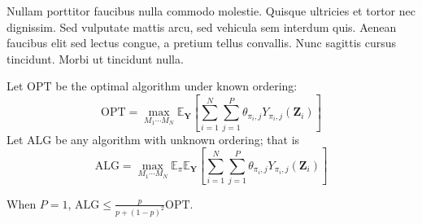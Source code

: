  Nullam porttitor faucibus nulla commodo molestie. Quisque ultricies et tortor nec dignissim. Sed vulputate mattis arcu, sed vehicula sem interdum quis. Aenean faucibus elit sed lectus congue, a pretium tellus convallis. Nunc sagittis cursus tincidunt. Morbi ut tincidunt nulla.
\begin{theorem}
    Let $\mathrm{OPT}$ be the optimal algorithm under known ordering: 
    \begin{equation}
        \mathrm{OPT} = \max_{M_{1} \cdots M_{N}} \mathbb{E}_{\mathbf{Y}}[\sum_{i=1}^{N} \sum_{j=1}^{P} \theta_{\pi_{i},j} Y_{\pi_{i},j}(\mathbf{Z}_{i})]
    \end{equation}
    Let $\mathrm{ALG}$ be any algorithm with unknown ordering; that is
    \begin{equation}
        \mathrm{ALG} = \max_{M_{1} \cdots M_{N}} \mathbb{E}_{\pi} \mathbb{E}_{\mathbf{Y}}[\sum_{i=1}^{N} \sum_{j=1}^{P} \theta_{\pi_{i},j} Y_{\pi_{i},j}(\mathbf{Z}_{i})]
    \end{equation}

    When $P=1$, $\mathrm{ALG} \leq \frac{p}{p+({1-p})^2} \mathrm{OPT}$. 
\end{theorem}
